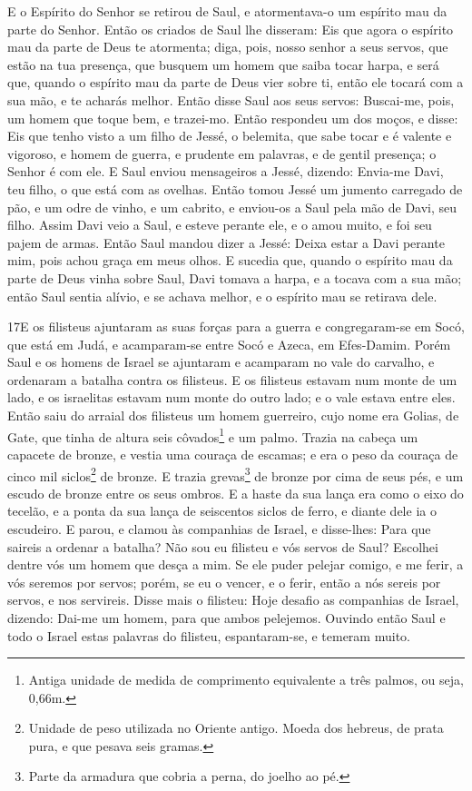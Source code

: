 E o Espírito do Senhor se retirou de Saul, e atormentava-o um
espírito mau da parte do Senhor. Então os criados de Saul lhe
disseram: Eis que agora o espírito mau da parte de Deus te
atormenta; diga, pois, nosso senhor a seus servos, que estão
na tua presença, que busquem um homem que saiba tocar harpa, e será
que, quando o espírito mau da parte de Deus vier sobre ti, então ele
tocará com a sua mão, e te acharás melhor. Então disse Saul
aos seus servos: Buscai-me, pois, um homem que toque bem, e
trazei-mo. Então respondeu um dos moços, e disse: Eis que
tenho visto a um filho de Jessé, o belemita, que sabe tocar e é
valente e vigoroso, e homem de guerra, e prudente em palavras, e de
gentil presença; o Senhor é com ele. E Saul enviou
mensageiros a Jessé, dizendo: Envia-me Davi, teu filho, o que está
com as ovelhas. Então tomou Jessé um jumento carregado de
pão, e um odre de vinho, e um cabrito, e enviou-os a Saul pela mão
de Davi, seu filho. Assim Davi veio a Saul, e esteve perante
ele, e o amou muito, e foi seu pajem de armas. Então Saul
mandou dizer a Jessé: Deixa estar a Davi perante mim, pois achou
graça em meus olhos. E sucedia que, quando o espírito mau da
parte de Deus vinha sobre Saul, Davi tomava a harpa, e a tocava com
a sua mão; então Saul sentia alívio, e se achava melhor, e o
espírito mau se retirava dele.

\medskip

\lettrine{17} E os filisteus ajuntaram as suas forças para a
guerra e congregaram-se em Socó, que está em Judá, e acamparam-se
entre Socó e Azeca, em Efes-Damim. Porém Saul e os homens de
Israel se ajuntaram e acamparam no vale do carvalho, e ordenaram a
batalha contra os filisteus. E os filisteus estavam num monte de
um lado, e os israelitas estavam num monte do outro lado; e o vale
estava entre eles. Então saiu do arraial dos filisteus um homem
guerreiro, cujo nome era Golias, de Gate, que tinha de altura seis
côvados\footnote{Antiga unidade de medida de comprimento equivalente
a três palmos, ou seja, 0,66m.} e um palmo. Trazia na cabeça um
capacete de bronze, e vestia uma couraça de escamas; e era o peso da
couraça de cinco mil siclos\footnote{Unidade de peso utilizada no
Oriente antigo. Moeda dos hebreus, de prata pura, e que pesava seis
gramas.} de bronze. E trazia grevas\footnote{Parte da armadura
que cobria a perna, do joelho ao pé.} de bronze por cima de seus
pés, e um escudo de bronze entre os seus ombros. E a haste da
sua lança era como o eixo do tecelão, e a ponta da sua lança de
seiscentos siclos de ferro, e diante dele ia o escudeiro. E
parou, e clamou às companhias de Israel, e disse-lhes: Para que
saireis a ordenar a batalha? Não sou eu filisteu e vós servos de
Saul? Escolhei dentre vós um homem que desça a mim. Se ele puder
pelejar comigo, e me ferir, a vós seremos por servos; porém, se eu o
vencer, e o ferir, então a nós sereis por servos, e nos servireis.
Disse mais o filisteu: Hoje desafio as companhias de Israel,
dizendo: Dai-me um homem, para que ambos pelejemos. Ouvindo
então Saul e todo o Israel estas palavras do filisteu,
espantaram-se, e temeram muito.

